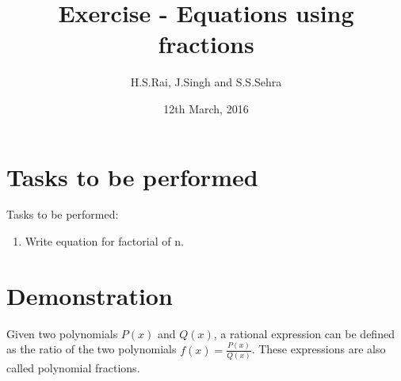 \documentclass{article}
\title{Exercise  - Equations using fractions}
\author{H.S.Rai, J.Singh and S.S.Sehra}
\date{12th March, 2016}
\begin{document}
	\maketitle
	\section*{Tasks to be performed}
	Tasks to be performed:
	\begin{enumerate}
		\item  Write equation for factorial of n.
	\end{enumerate}
\section*{Demonstration}

Given two polynomials $P(x)$ and $Q(x)$, a rational expression can be defined as the ratio of the two polynomials
$f(x)=\frac{P(x)}{Q(x)}$. These expressions are also called polynomial fractions.
\end{document}
